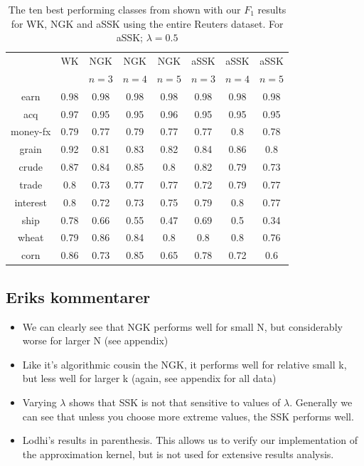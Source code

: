 \begin{table}
	\centering	
	\begin{tabular}{| c | c | c | c | c | c | c | c |}\hline
		& WK & NGK & NGK  & NGK  & aSSK & aSSK& aSSK \\ 
		&  & $n = 3$& $ n = 4 $ & $ n = 5 $ & $ n = 3 $& $ n = 4 $ & $ n = 5 $ \\ \hline
		earn & 0.98 & 0.98 &  0.98&  0.98 & 0.98 & 0.98 & 0.98 \\ \hline
		acq & 0.97 & 0.95 &  0.95 &  0.96 & 0.95 & 0.95 & 0.95 \\ \hline
		money-fx & 0.79 & 0.77 &  0.79 & 0.77 & 0.77 & 0.8 & 0.78 \\ \hline
		grain & 0.92 & 0.81 &  0.83& 0.82 & 0.84 & 0.86 & 0.8 \\ \hline
		crude & 0.87 & 0.84 &  0.85 & 0.8 & 0.82 & 0.79 & 0.73 \\ \hline
		trade & 0.8 & 0.73 &  0.77 & 0.77 & 0.72 & 0.79 & 0.77 \\ \hline
		interest & 0.8 & 0.72 &  0.73 & 0.75 & 0.79 & 0.8 & 0.77 \\ \hline
		ship & 0.78 & 0.66 &  0.55 & 0.47 & 0.69 & 0.5 & 0.34 \\ \hline
		wheat & 0.79 & 0.86 &  0.84 & 0.8 & 0.8 & 0.8 & 0.76 \\ \hline
		corn & 0.86 & 0.73 &  0.85 & 0.65 & 0.78 & 0.72 & 0.6 \\ \hline	
	\end{tabular}
\caption{The ten best performing classes from \cite{lodhi} shown with our $ F_1 $ results for WK, NGK and  aSSK using the entire Reuters dataset. For aSSK; $ \lambda = 0.5 $\label{tab:full_data} }
\end{table}


\subsection{Eriks kommentarer}
\begin{itemize}
	\item We can clearly see that NGK performs well for small N, but considerably worse for larger N (see appendix)
	
	\item Like it's algorithmic cousin the NGK, it performs well for relative small k, but less well for larger k (again, see appendix for all data)
	
	\item  Varying $ \lambda $ shows that SSK is not that sensitive to values of $ \lambda $. Generally we can see that unless you choose more extreme values, the SSK performs well.
	
	\item Lodhi's results in parenthesis. This allows us to verify our implementation of the approximation kernel, but is not used for extensive results analysis.
\end{itemize}
